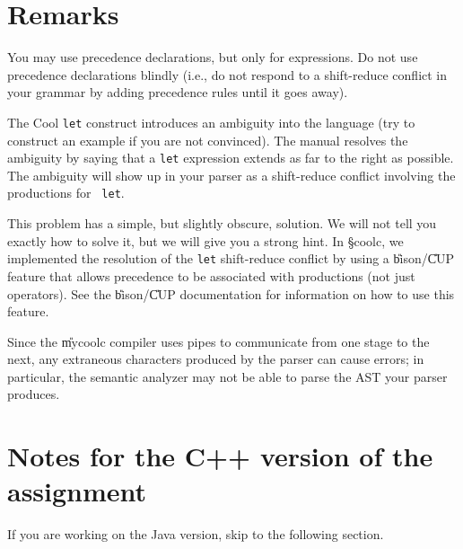 \documentclass[11pt]{article}
\begin{document}
\section {Remarks}

You may use precedence declarations, but only for expressions.  Do not
use precedence declarations blindly (i.e., do not respond to a
shift-reduce conflict in your grammar by adding precedence rules until
it goes away).

The Cool {\tt let} construct introduces an ambiguity into the language
(try to construct an example if you are not convinced).  The manual
resolves the ambiguity by saying that a {\tt let} expression extends
as far to the right as possible.  The ambiguity will show up in your
parser as a shift-reduce conflict involving the productions for {\tt
let}.

This problem has a simple, but slightly obscure, solution.  We will not
tell you exactly how to solve it, but we will give you a strong hint.
In \S{coolc}, we implemented the resolution of the {\tt let}
shift-reduce conflict by using a \U{bison}/\U{CUP} feature that allows
precedence to be associated with productions (not just operators).  See
the \U{bison}/\U{CUP} documentation for information on how to use this
feature.

Since the \U{mycoolc} compiler uses pipes to communicate from one
stage to the next, any extraneous characters produced by the parser
can cause errors; in particular, the semantic analyzer may not be able
to parse the AST your parser produces.

\section{Notes for the C++ version of the assignment}

If you are working on the Java version, skip to the following section.
\end{document}
